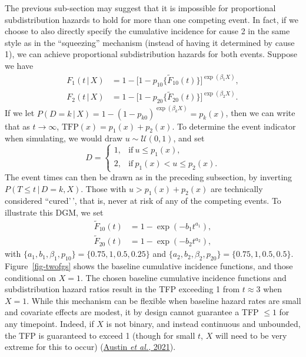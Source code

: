 \documentclass[
  letterpaper,
  DIV=11,
  numbers=noendperiod]{scrreprt}
\newcommand{\given}{\,|\,}
\begin{document}
The previous sub-section may suggest that it is impossible for
proportional subdistribution hazards to hold for more than one competing
event. In fact, if we choose to also directly specify the cumulative
incidence for cause 2 in the same style as in the ``squeezing''
mechanism (instead of having it determined by cause 1), we can achieve
proportional subdistribution hazards for both events. Suppose we have
\begin{align*}
    F_1(t \given X) &= 1 - \big[1 - p_{10}\{\tilde{F}_{10}(t)\} \big]^{\exp(\beta_1X)}, \\
    F_2(t \given X) &= 1 - \big[1 - p_{20}\{\tilde{F}_{20}(t)\} \big]^{\exp(\beta_2X)}.
\end{align*} If we let
\(P(D = k \given X) = 1 - (1 - p_{k0})^{\exp(\beta_{k}X)} = p_k(x)\),
then we can write that as \(t \to \infty\),
\(\text{TFP}(x) = p_1(x) + p_2(x)\). To determine the event indicator
when simulating, we would draw \(u \sim \mathcal{U}(0,1)\), and set
\begin{equation*}
    D = 
    \begin{cases}
        1, & \text{if}\ u \leq p_1(x), \\
        2, & \text{if}\ p_1(x) < u \leq p_2(x). 
    \end{cases}
\end{equation*} The event times can then be drawn as in the preceding
subsection, by inverting \(P(T \leq t \given D=k, X)\). Those with
\(u > p_1(x) + p_2(x)\) are technically considered ``cured'\,', that is,
never at risk of any of the competing events. To illustrate this DGM, we
set \begin{align*}
    \tilde{F}_{10}(t) &= 1 - \exp(-b_1t^{a_1}), \\
    \tilde{F}_{20}(t) &= 1 - \exp(-b_2t^{a_2}),
\end{align*} with
\(\{a_1, b_1, \beta_1, p_{10}\} = \{0.75, 1, 0.5, 0.25\}\) and
\(\{a_2, b_2,\beta_{2}, p_{20}\} = \{0.75, 1, 0.5, 0.5\}\).
Figure~\ref{fig-twofgs} shows the baseline cumulative incidence
functions, and those conditional on \(X = 1\). The chosen baseline
cumulative incidence functions and subdistribution hazard ratios result
in the TFP exceeding 1 from \(t \approx 3\) when \(X = 1\). While this
mechanism can be flexible when baseline hazard rates are small and
covariate effects are modest, it by design cannot guarantee a TFP
\(\leq 1\) for any timepoint. Indeed, if \(X\) is not binary, and
instead continuous and unbounded, the TFP is guaranteed to exceed 1
(though for small \(t\), \(X\) will need to be very extreme for this to
occur)
(\protect\hyperlink{ref-austinFineGraySubdistributionHazard2021}{Austin
\emph{et al.}, 2021}).
\end{document}
